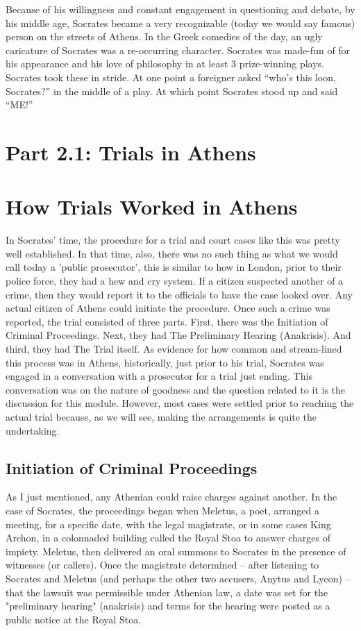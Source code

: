 Because of his willingness and constant engagement in questioning and debate, by his middle age, Socrates became a very recognizable (today we would say famous) person on the streets of Athens. In the Greek comedies of the day, an ugly caricature of Socrates was a re-occurring character. Socrates was made-fun of for his appearance and his love of philosophy in at least 3 prize-winning plays. Socrates took these in stride. At one point a foreigner asked “who’s this loon, Socrates?” in the middle of a play. At which point Socrates stood up and said “ME!”

\section{Part 2.1: Trials in Athens}

\section{How Trials Worked in Athens}

In Socrates' time, the procedure for a trial and court cases like this was pretty well established. In that time, also, there was no such thing as what we would call today a 'public prosecutor', this is similar to how in London, prior to their police force, they had a hew and cry system. If a citizen suspected another of a crime, then they would report it to the officials to have the case looked over. Any actual citizen of Athens could initiate the procedure. Once such a crime was reported, the trial consisted of three parts. First, there was the Initiation of Criminal Proceedings. Next, they had The Preliminary Hearing (Anakrisis). And third, they had The Trial itself. As evidence for how common and stream-lined this process was in Athens, historically, just prior to his trial, Socrates was engaged in a conversation with a prosecutor for a trial just ending. This conversation was on the nature of goodness and the question related to it is the discussion for this module. However, most cases were settled prior to reaching the actual trial because, as we will see, making the arrangements is quite the undertaking.
\subsection{Initiation of Criminal Proceedings}

As I just mentioned, any Athenian could raise charges against another. In the case of Socrates, the proceedings began when Meletus, a poet, arranged a meeting, for a specific date, with the legal magistrate, or in some cases King Archon, in a colonnaded building called the Royal Stoa to answer charges of impiety. Meletus, then delivered an oral summons to Socrates in the presence of witnesses (or callers). Once the magistrate determined – after listening to Socrates and Meletus (and perhaps the other two accusers, Anytus and Lycon) – that the lawsuit was permissible under Athenian law, a date was set for the "preliminary hearing" (anakrisis) and terms for the hearing were posted as a public notice at the Royal Stoa.
